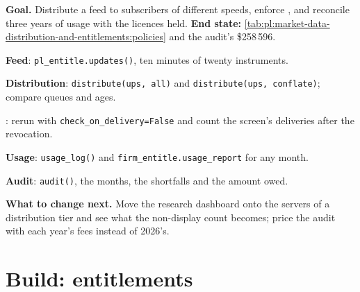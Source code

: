 \begin{tutorial}
\textbf{Goal.} Distribute a feed to subscribers of different speeds, enforce , and reconcile three years of usage with the
licences held. \textbf{End state:} \cref{tab:pl:market-data-distribution-and-entitlements:policies} and the audit's
\$258\,596.
\begin{tutsteps}
\item \textbf{Feed}: \texttt{pl\_entitle.updates()}, ten minutes of twenty instruments.
\item \textbf{Distribution}: \texttt{distribute(ups, \textquotedbl all\textquotedbl)} and
\texttt{distribute(ups, \textquotedbl conflate\textquotedbl)}; compare queues and ages.
\item \textbf{}: rerun with \texttt{check\_on\_delivery=False} and count the screen's deliveries after the revocation.
\item \textbf{Usage}: \texttt{usage\_log()} and \texttt{firm\_entitle.usage\_report} for any month.
\item \textbf{Audit}: \texttt{audit()}, the months, the shortfalls and the amount owed.
\end{tutsteps}
\textbf{What to change next.} Move the research dashboard onto the servers of a distribution tier and see what the non-display count becomes;
price the audit with each year's fees instead of 2026's.
\end{tutorial}

\section{Build: entitlements}\label{bld:pl:market-data-distribution-and-entitlements:entitle}

